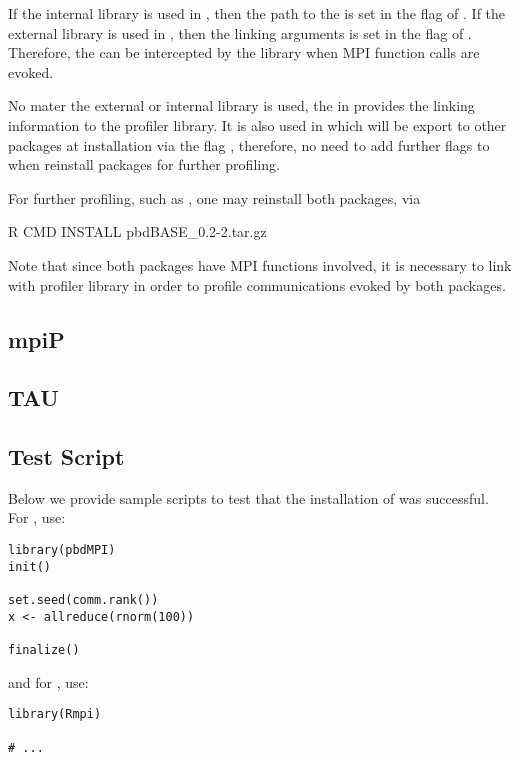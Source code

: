 If the internal library is used in ,
then the path to the  is set in the flag
 of .
If the external library is used in ,
then the linking arguments  is set
in the flag  of .
Therefore, the  can be intercepted by the  library
when MPI function calls are evoked.

No mater the external or internal library is used, the 
in  provides the linking information to the
profiler library. It is also used in  which will be
export to other  packages at installation via the flag
, therefore, no need to add further flags to
 when reinstall packages for further profiling.

For further profiling, such as , one may
reinstall both packages, via
\begin{Command}
R CMD INSTALL pbdBASE_0.2-2.tar.gz
\end{Command}
Note that since both packages have MPI  functions involved, it
is necessary to link with profiler library in order to profile communications
evoked by both packages.


\subsection{mpiP}
\label{sec:mpiP}


\subsection{TAU}
\label{sec:TAU}


\subsection{Test Script}

Below we provide sample scripts to test that the installation of  was successful.  For , use:
\begin{lstlisting}[title=Test script for pbdMPI]
library(pbdMPI)
init()

set.seed(comm.rank())
x <- allreduce(rnorm(100))

finalize()
\end{lstlisting}
and for , use:
\begin{lstlisting}[title=Test script for pbdMPI]
library(Rmpi)

# ...
\end{lstlisting}
